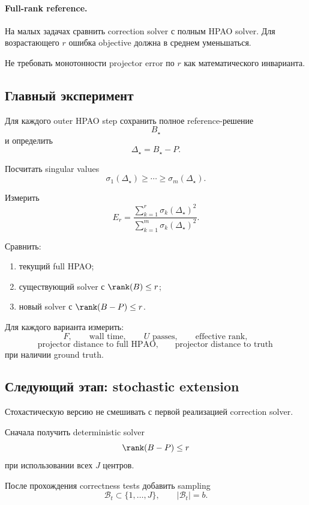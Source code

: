 \paragraph{Full-rank reference.}

На малых задачах сравнить correction solver с полным HPAO solver.
Для возрастающего $r$ ошибка objective должна в среднем уменьшаться.

Не требовать монотонности projector error по $r$ как математического
инварианта.

\subsection{Главный эксперимент}

Для каждого outer HPAO step сохранить полное reference-решение
\[
    B_\star
\]
и определить
\[
    \Delta_\star=B_\star-P.
\]

Посчитать singular values
\[
    \sigma_1(\Delta_\star)
    \ge
    \cdots
    \ge
    \sigma_m(\Delta_\star).
\]

Измерить
\[
\boxed{
    E_r
    =
    \frac{
        \sum_{k=1}^r
        \sigma_k(\Delta_\star)^2
    }{
        \sum_{k=1}^m
        \sigma_k(\Delta_\star)^2
    }.
}
\]

Сравнить:
\begin{enumerate}
    \item текущий full HPAO;
    \item существующий solver с $\rank(B)\le r$;
    \item новый solver с $\rank(B-P)\le r$.
\end{enumerate}

Для каждого варианта измерить:
\[
    F,
    \qquad
    \text{wall time},
    \qquad
    \text{$U$ passes},
    \qquad
    \text{effective rank},
\]
\[
    \text{projector distance to full HPAO},
    \qquad
    \text{projector distance to truth}
\]
при наличии ground truth.

\subsection{Следующий этап: stochastic extension}

Стохастическую версию не смешивать с первой реализацией correction solver.

Сначала получить deterministic solver
\[
    \rank(B-P)\le r
\]
при использовании всех $J$ центров.

После прохождения correctness tests добавить sampling
\[
    \mathcal B_t
    \subset
    \{1,\ldots,J\},
    \qquad
    |\mathcal B_t|=b.
\]

